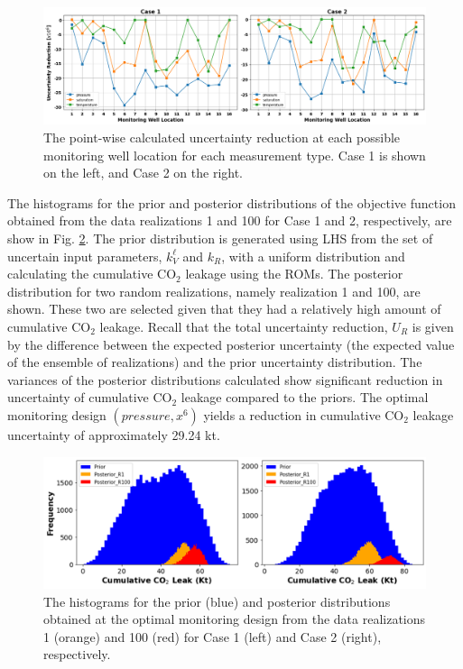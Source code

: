 \documentclass[10pt, twoside]{article}
\begin{document}
\begin{figure} [H]
\centering
\includegraphics[width=16 cm]{Figure 11.png}
\caption{The point-wise calculated uncertainty reduction at each possible monitoring well location for each measurement type. Case 1 is shown on the left, and Case 2 on the right.}
\label{point_ur}
\end{figure}

The histograms for the prior and posterior distributions of the objective function obtained from the data realizations 1 and 100 for Case 1 and 2, respectively, are show in Fig. \ref{ur_dist}. The prior distribution is generated using LHS from the set of uncertain input parameters, $k_V^\ell$ and $k_R$, with a uniform distribution and calculating the cumulative CO$_2$ leakage using the ROMs. The posterior distribution for two random realizations, namely realization 1 and 100, are shown. These two are selected given that they had a relatively high amount of cumulative CO$_2$ leakage. Recall that the total uncertainty reduction, $U_R$ is given by the difference between the expected posterior uncertainty (the expected value of the ensemble of realizations) and the prior uncertainty distribution. The variances of the posterior distributions calculated show significant reduction in uncertainty of cumulative CO$_2$ leakage compared to the priors. The optimal monitoring design $(pressure, x^6)$ yields a reduction in cumulative CO$_2$ leakage uncertainty of approximately 29.24 kt. 

\begin{figure} [H]
\centering
\includegraphics[width=16 cm]{Figure 12.png}
\caption{The histograms for the prior (blue) and posterior distributions obtained at the optimal monitoring design from the data realizations 1 (orange) and 100 (red) for Case 1 (left) and Case 2 (right), respectively.}
\label{ur_dist}
\end{figure}
\end{document}
